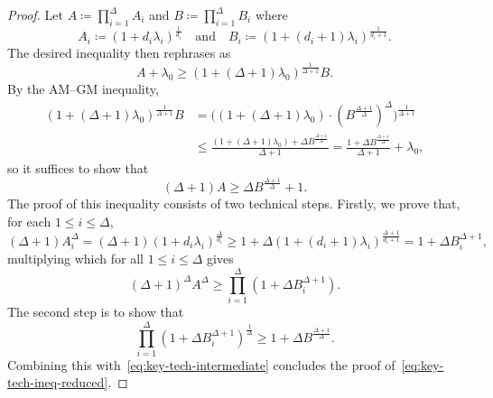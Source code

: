 \documentclass{article}
\numberwithin{equation}{section}
\theoremstyle{plain}
\theoremstyle{definition}
\theoremstyle{remark} %
\newcommand{\defeq}{\coloneqq}
\begin{document}
\begin{proof}
    Let \(A\defeq \prod_{i=1}^\Delta A_i\) and \(B\defeq \prod_{i=1}^\Delta B_i\) where
    \[
        A_i \defeq (1+d_i\lambda_i)^{\frac{1}{d_i}}
        \quad\text{and}\quad
        B_i \defeq (1+(d_i+1)\lambda_i)^{\frac{1}{d_i+1}}.
    \]
    The desired inequality then rephrases as
    \begin{equation}\label{eq:goal}
        A + \lambda_0 \ge (1 + (\Delta+1)\lambda_0)^{\frac{1}{\Delta+1}} B.
    \end{equation}
    By the AM--GM inequality,
    \begin{align*}
        (1 + (\Delta+1)\lambda_0)^{\frac{1}{\Delta+1}} B
        &= \bigl( (1 + (\Delta+1)\lambda_0) \cdot (B^{\frac{\Delta+1}{\Delta}})^\Delta \bigr)^{\frac{1}{\Delta+1}}\\
        &\le \frac{(1 + (\Delta+1)\lambda_0) + \Delta B^{\frac{\Delta+1}{\Delta}}}{\Delta+1}
        = \frac{1 + \Delta B^{\frac{\Delta+1}{\Delta}}}{\Delta+1} + \lambda_0,
    \end{align*}
    so it suffices to show that
    \begin{equation}\label{eq:key-tech-ineq-reduced}
        (\Delta+1)A \ge \Delta B^{\frac{\Delta+1}{\Delta}} + 1.
    \end{equation}
    The proof of this inequality consists of two technical steps. Firstly, we prove that, for each \(1\le i\le \Delta\),
    \begin{equation}\label{eq:indep-multiaff-lower-bd-component}
         (\Delta+1)A_i^{\Delta}=(\Delta+1)(1+d_i\lambda_i)^{\frac{\Delta}{d_i}} \ge 1+ \Delta(1+(d_i+1)\lambda_i)^{\frac{\Delta+1}{d_i+1}}=1+\Delta B_i^{\Delta+1},
    \end{equation}
    multiplying which for all \(1\le i\le \Delta\) gives
    \begin{equation}\label{eq:key-tech-intermediate}
        (\Delta+1)^\Delta A^\Delta \ge \prod_{i=1}^\Delta (1 + \Delta B_i^{\Delta+1}).
    \end{equation}
    The second step is to show that 
    \begin{equation}\label{eq:key-tech-lem-goal-2}
        \prod_{i=1}^\Delta (1 + \Delta B_i^{\Delta+1})^{\frac{1}{\Delta}}
        \ge
        1+\Delta B^{\frac{\Delta+1}{\Delta}}.
    \end{equation}
    Combining this with~\eqref{eq:key-tech-intermediate} concludes the proof of~\eqref{eq:key-tech-ineq-reduced}.


\end{proof}
\end{document}
